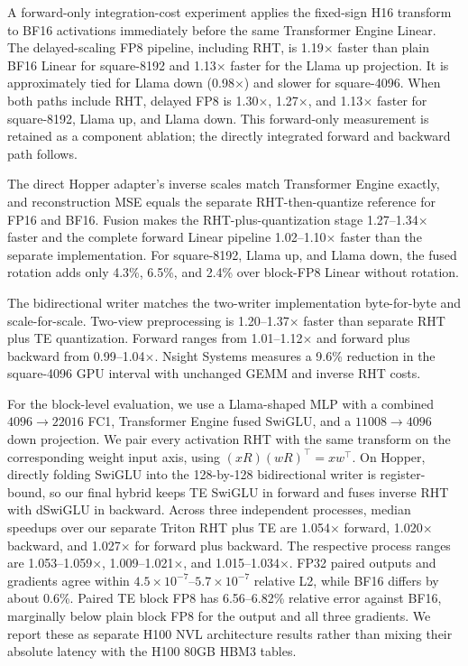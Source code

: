 \documentclass{article}
\begin{document}
A forward-only integration-cost experiment applies the fixed-sign H16 transform
to BF16 activations immediately before the same Transformer Engine Linear. The
delayed-scaling FP8 pipeline, including RHT, is 1.19$\times$ faster than plain
BF16 Linear for square-8192 and 1.13$\times$ faster for the Llama up
projection. It is approximately tied for Llama down (0.98$\times$) and slower
for square-4096. When both paths include RHT, delayed FP8 is 1.30$\times$,
1.27$\times$, and 1.13$\times$ faster for square-8192, Llama up, and Llama
down. This forward-only measurement is retained as a component ablation; the
directly integrated forward and backward path follows.

The direct Hopper adapter's inverse scales match Transformer Engine exactly,
and reconstruction MSE equals
the separate RHT-then-quantize reference for FP16 and BF16. Fusion makes the
RHT-plus-quantization stage 1.27--1.34$\times$ faster and the complete forward
Linear pipeline 1.02--1.10$\times$ faster than the separate implementation.
For square-8192, Llama up, and Llama down, the fused rotation adds only 4.3\%,
6.5\%, and 2.4\% over block-FP8 Linear without rotation.

The bidirectional writer matches the two-writer implementation byte-for-byte
and scale-for-scale. Two-view preprocessing is 1.20--1.37$\times$ faster than
separate RHT plus TE quantization. Forward ranges from 1.01--1.12$\times$ and
forward plus backward from 0.99--1.04$\times$. Nsight Systems measures a
9.6\% reduction in the square-4096 GPU interval with unchanged GEMM and inverse
RHT costs.

For the block-level evaluation, we use a Llama-shaped MLP with a combined
$4096\rightarrow22016$ FC1, Transformer Engine fused SwiGLU, and a
$11008\rightarrow4096$ down projection. We pair every activation RHT with the
same transform on the corresponding weight input axis, using
$(xR)(wR)^\top=xw^\top$. On Hopper, directly folding SwiGLU into the 128-by-128
bidirectional writer is register-bound, so our final hybrid keeps TE SwiGLU in
forward and fuses inverse RHT with dSwiGLU in backward. Across three independent
processes, median speedups over our separate Triton RHT plus TE are 1.054$\times$ forward,
1.020$\times$ backward, and 1.027$\times$ for forward plus backward.
The respective process ranges are 1.053--1.059$\times$,
1.009--1.021$\times$, and 1.015--1.034$\times$. FP32 paired outputs and gradients agree within
$4.5\times10^{-7}$--$5.7\times10^{-7}$ relative L2, while BF16 differs by about
0.6\%. Paired TE block FP8 has 6.56--6.82\% relative error against BF16,
marginally below plain block FP8 for the output and all three gradients. We
report these as separate H100 NVL architecture results rather than mixing their
absolute latency with the H100 80GB HBM3 tables.
\end{document}
